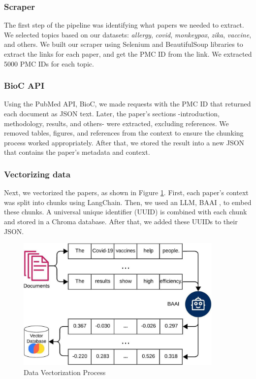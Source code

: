 \subsubsection{Scraper}
The first step of the pipeline was identifying what papers we needed to extract. We selected topics based on our datasets: \textit{allergy}, \textit{covid}, \textit{monkeypox}, \textit{zika}, \textit{vaccine}, and others. We built our scraper using Selenium and BeautifulSoup libraries to extract the links for each paper, and get the PMC ID  from the link.  We extracted 5000 PMC IDs for each topic.

\subsubsection{BioC API}
Using the PubMed API, BioC, we made requests with the PMC ID that returned each document as JSON text. Later, the paper's sections -introduction, methodology, results, and others- were extracted, excluding references. We removed tables, figures, and references from the context to ensure the chunking process worked appropriately. After that, we stored the result into a new JSON that contains the paper's metadata and context. 

\subsubsection{Vectorizing data}
Next, we vectorized the papers, as shown in Figure \ref{fig:vector}. First, each paper’s context was split into chunks using LangChain. Then, we used an LLM, BAAI \cite{bge_embedding}, to embed these chunks. A universal unique identifier (UUID) is combined with each chunk and stored in a Chroma database. After that, we added these UUIDs to their JSON. 

\begin{figure}[!htb]
	\begin{center}
		\includegraphics[width=0.9\textwidth]{figures/Data_vectorization.jpeg} %
	\end{center}
	\caption{Data Vectorization Process} %
	\label{fig:vector}
\end{figure}



